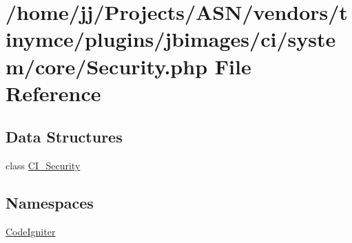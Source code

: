 \hypertarget{_security_8php}{}\section{/home/jj/\+Projects/\+A\+S\+N/vendors/tinymce/plugins/jbimages/ci/system/core/\+Security.php File Reference}
\label{_security_8php}
\subsection*{Data Structures}
\begin{DoxyCompactItemize}
\item 
class \hyperlink{class_c_i___security}{C\+I\+\_\+\+Security}
\end{DoxyCompactItemize}
\subsection*{Namespaces}
\begin{DoxyCompactItemize}
\item 
 \hyperlink{namespace_code_igniter}{Code\+Igniter}
\end{DoxyCompactItemize}

